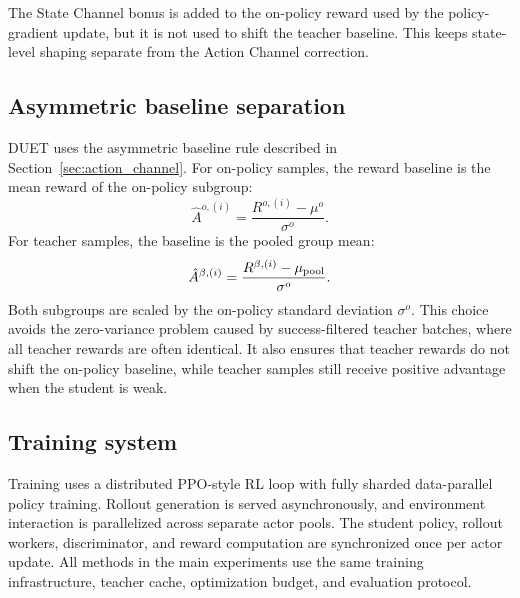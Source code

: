 The State Channel bonus is added to the on-policy reward used by the policy-gradient update, but it is not used to shift the teacher baseline.
This keeps state-level shaping separate from the Action Channel correction.

\subsection{Asymmetric baseline separation}
\label{app:baseline_sep_impl}

DUET uses the asymmetric baseline rule described in Section~\ref{sec:action_channel}.
For on-policy samples, the reward baseline is the mean reward of the on-policy subgroup:
\begin{equation}
\hat A^{o,(i)}
=
\frac{R^{o,(i)}-\mu^o}{\sigma^o}.
\label{eq:appendix_on_policy_adv}
\end{equation}
For teacher samples, the baseline is the pooled group mean:
\begin{equation}
\hat A^{\beta,(i)}
=
\frac{R^{\beta,(i)}-\mu_{\rm pool}}{\sigma^o}.
\label{eq:appendix_teacher_adv}
\end{equation}
Both subgroups are scaled by the on-policy standard deviation $\sigma^o$.
This choice avoids the zero-variance problem caused by success-filtered teacher batches, where all teacher rewards are often identical.
It also ensures that teacher rewards do not shift the on-policy baseline, while teacher samples still receive positive advantage when the student is weak.

\subsection{Training system}
\label{app:software}

Training uses a distributed PPO-style RL loop with fully sharded data-parallel policy training.
Rollout generation is served asynchronously, and environment interaction is parallelized across separate actor pools.
The student policy, rollout workers, discriminator, and reward computation are synchronized once per actor update.
All methods in the main experiments use the same training infrastructure, teacher cache, optimization budget, and evaluation protocol.